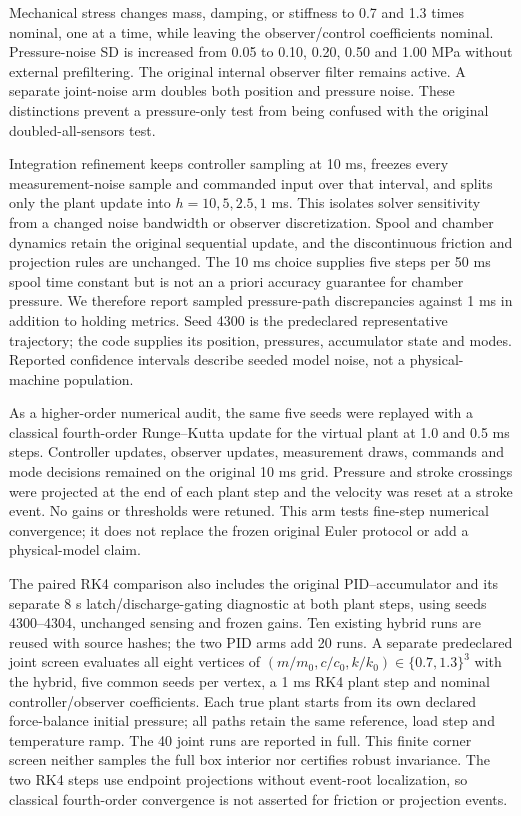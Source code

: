 \documentclass[machines,article,submit,pdftex,moreauthors]{Definitions/mdpi}
\begin{document}
Mechanical stress changes mass, damping, or stiffness to 0.7 and 1.3 times nominal, one at a time, while leaving the observer/control coefficients nominal. Pressure-noise SD is increased from 0.05 to 0.10, 0.20, 0.50 and 1.00 MPa without external prefiltering. The original internal observer filter remains active. A separate joint-noise arm doubles both position and pressure noise. These distinctions prevent a pressure-only test from being confused with the original doubled-all-sensors test.

Integration refinement keeps controller sampling at 10 ms, freezes every measurement-noise sample and commanded input over that interval, and splits only the plant update into $h=10,5,2.5,1$ ms. This isolates solver sensitivity from a changed noise bandwidth or observer discretization. Spool and chamber dynamics retain the original sequential update, and the discontinuous friction and projection rules are unchanged. The 10 ms choice supplies five steps per 50 ms spool time constant but is not an a priori accuracy guarantee for chamber pressure. We therefore report sampled pressure-path discrepancies against 1 ms in addition to holding metrics. Seed 4300 is the predeclared representative trajectory; the code supplies its position, pressures, accumulator state and modes. Reported confidence intervals describe seeded model noise, not a physical-machine population.

As a higher-order numerical audit, the same five seeds were replayed with a classical fourth-order Runge--Kutta update for the virtual plant at 1.0 and 0.5 ms steps. Controller updates, observer updates, measurement draws, commands and mode decisions remained on the original 10 ms grid. Pressure and stroke crossings were projected at the end of each plant step and the velocity was reset at a stroke event. No gains or thresholds were retuned. This arm tests fine-step numerical convergence; it does not replace the frozen original Euler protocol or add a physical-model claim.

The paired RK4 comparison also includes the original PID--accumulator and its separate 8 s latch/discharge-gating diagnostic at both plant steps, using seeds 4300--4304, unchanged sensing and frozen gains. Ten existing hybrid runs are reused with source hashes; the two PID arms add 20 runs. A separate predeclared joint screen evaluates all eight vertices of $(m/m_0,c/c_0,k/k_0)\in\{0.7,1.3\}^3$ with the hybrid, five common seeds per vertex, a 1 ms RK4 plant step and nominal controller/observer coefficients. Each true plant starts from its own declared force-balance initial pressure; all paths retain the same reference, load step and temperature ramp. The 40 joint runs are reported in full. This finite corner screen neither samples the full box interior nor certifies robust invariance. The two RK4 steps use endpoint projections without event-root localization, so classical fourth-order convergence is not asserted for friction or projection events.
\end{document}
